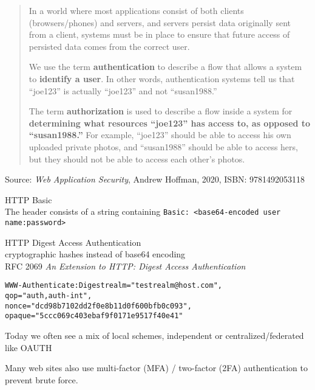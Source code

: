 \documentclass[Screen16to9,17pt]{foils}
\begin{document}
\begin{quote}
In a world where most applications consist of both clients (browsers/phones) and servers, and servers persist data originally sent from a client, systems must be in place to ensure that future access of persisted data comes from the correct user.

We use the term {\bf authentication} to describe a flow that allows a system to {\bf identify a user}. In other words, authentication systems tell us that “joe123” is actually “joe123” and not “susan1988.”

The term {\bf authorization} is used to describe a flow inside a system for {\bf determining what resources “joe123” has access to, as opposed to “susan1988.”} For example, “joe123” should be able to access his own uploaded private photos, and “susan1988” should be able to access hers, but they should not be able to access each other’s photos.
\end{quote}
Source: \emph{Web Application Security}, Andrew Hoffman, 2020, ISBN: 9781492053118

\begin{list2}
    \item\end{list2}




\begin{list2}
\item HTTP Basic \\
The header consists of a string containing \verb+Basic: <base64-encoded user name:password>+

\item HTTP Digest Access Authentication\\
cryptographic hashes instead of base64 encoding\\
RFC 2069 \emph{An Extension to HTTP: Digest Access Authentication}
\begin{alltt}\footnotesize
WWW-Authenticate: Digest realm="testrealm@host.com",
                        qop="auth,auth-int",
                        nonce="dcd98b7102dd2f0e8b11d0f600bfb0c093",
                        opaque="5ccc069c403ebaf9f0171e9517f40e41"
\end{alltt}
\item Today we often see a mix of local schemes, independent or centralized/federated like OAUTH\\

\item Many web sites also use multi-factor (MFA) / two-factor (2FA) authentication to prevent brute force.

\end{list2}
\end{document}
